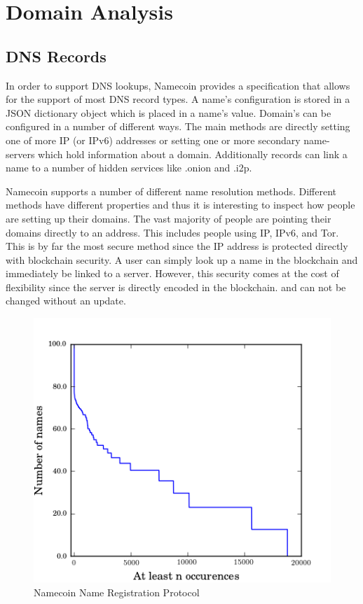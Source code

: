 \section{Domain Analysis}

\subsection{DNS Records}

In order to support DNS lookups, Namecoin provides a specification that allows for the support of most DNS record types. A name's configuration is stored in a JSON dictionary object which is placed in a name's value. Domain's can be configured in a number of different ways. The main methods are directly setting one of more IP (or IPv6) addresses or setting one or more secondary name-servers which hold information about a domain. Additionally records can link a name to a number of hidden services like .onion\cite{onion} and .i2p\cite{i2p}.

Namecoin supports a number of different name resolution methods. Different methods have different properties and thus it is interesting to inspect how people are setting up their domains. The vast majority of people are pointing their domains directly to an address. This includes people using IP, IPv6, and Tor. This is by far the most secure method since the IP address is protected directly with blockchain security. A user can simply look up a name in the blockchain and immediately be linked to a server. However, this security comes at the cost of flexibility since the server is directly encoded in the blockchain. and can not be changed without an update.

\begin{figure}
  \centering
  \includegraphics[width=0.9\columnwidth]{figures/squatters2}
  \caption{Namecoin Name Registration Protocol}
  \label{fig:registration}
\end{figure}


